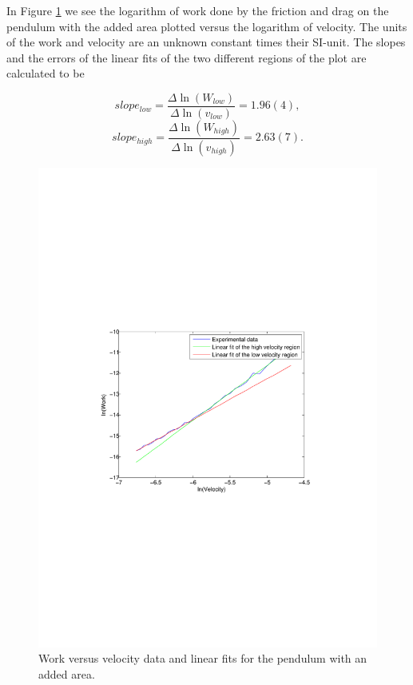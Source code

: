 \documentclass[11pt, a4paper]{article}
\begin{document}
In Figure \ref{f:paper} we see the logarithm of work done by the friction and 
drag on the pendulum with the added area plotted versus the logarithm of velocity. 
The units of the work and velocity are an unknown constant times their SI-unit. 
The slopes and the errors of the linear fits of the two different regions of the plot are calculated to be

\[
	slope_{low}=\frac{\Delta\ln(W_{low})}{\Delta\ln(v_{low})} = 1.96(4),
\]\[
	slope_{high}=\frac{\Delta\ln(W_{high})}{\Delta\ln(v_{high})} = 2.63(7).
\]

\begin{figure}[h]
	\centering
	\includegraphics[trim=10.0cm 10.0cm 10.0cm 10.0cm, scale=0.7]{paper}
	\caption{Work versus velocity data and  linear fits for the pendulum with an added area.}
	\label{f:paper}
\end{figure}
\end{document}
